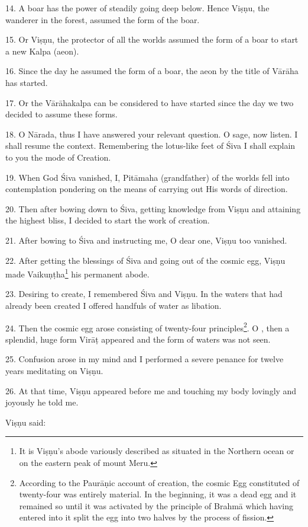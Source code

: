 14. A boar has the power of steadily going deep below. Hence Viṣṇu, the wanderer
in the forest, assumed the form of the boar.

15. Or Viṣṇu, the protector of all the worlds assumed the form of a boar to
start a new Kalpa (aeon).

16. Since the day he assumed the form of a boar, the aeon by the title of Vārāha
has started.

17. Or the Vārāhakalpa can be considered to have started since the day we two
decided to assume these forms.

18. O Nārada, thus I have answered your relevant question. O sage, now listen.
I shall resume the context. Remembering the lotus-like feet of Śiva I shall
explain to you the mode of Creation.

19. When God Śiva vanished, I, Pitāmaha (grandfather) of the worlds fell into
contemplation pondering on the means of carrying out His words of direction.

20. Then after bowing down to Śiva, getting knowledge from Viṣṇu and attaining
the highest bliss, I decided to start the work of creation.

21. After bowing to Śiva and instructing me, O dear one, Viṣṇu too vanished.

22. After getting the blessings of Śiva and going out of the cosmic egg, Viṣṇu
made Vaikuṇṭha\footnote{It is Viṣṇu’s abode variously described as situated in
the Northern ocean or on the eastern peak of mount Meru.} his permanent abode.

23. Desiring to create, I remembered Śiva and Viṣṇu. In the waters that had
already been created I offered handfuls of water as libation.

24. Then the cosmic egg arose consisting of twenty-four principles\footnote{
According to the Paurāṇic account of creation, the cosmic Egg constituted of
twenty-four  was entirely material. In the beginning, it was a dead
egg and it remained so until it was activated by the principle of Brahmā which
having entered into it split the egg into two halves by the process of fission.}.
O , then a splendid, huge form Virāṭ appeared and the form of
waters was not seen.

25. Confusion arose in my mind and I performed a severe penance for twelve years
meditating on Viṣṇu.

26. At that time, Viṣṇu appeared before me and touching my body lovingly and
joyously he told me.

Viṣṇu said:

